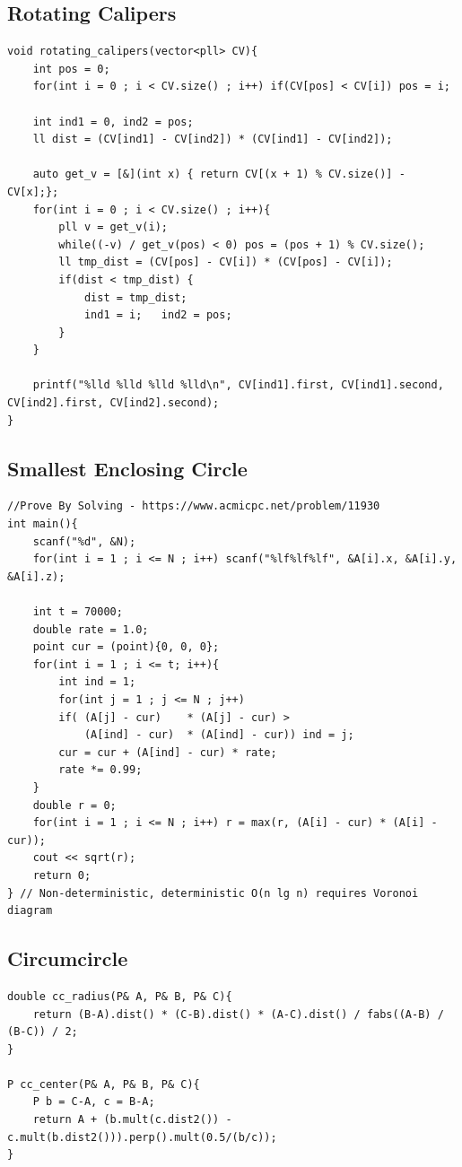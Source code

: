 \documentclass[landscape, 8pt, a4paper, oneside, twocolumn]{extarticle}
\begin{document}
\subsection{Rotating Calipers}
\begin{verbatim}
void rotating_calipers(vector<pll> CV){
    int pos = 0;
    for(int i = 0 ; i < CV.size() ; i++) if(CV[pos] < CV[i]) pos = i;

    int ind1 = 0, ind2 = pos;
    ll dist = (CV[ind1] - CV[ind2]) * (CV[ind1] - CV[ind2]);

    auto get_v = [&](int x) { return CV[(x + 1) % CV.size()] - CV[x];};
    for(int i = 0 ; i < CV.size() ; i++){
        pll v = get_v(i);
        while((-v) / get_v(pos) < 0) pos = (pos + 1) % CV.size();
        ll tmp_dist = (CV[pos] - CV[i]) * (CV[pos] - CV[i]);
        if(dist < tmp_dist) {
            dist = tmp_dist;
            ind1 = i;   ind2 = pos;
        }
    }

    printf("%lld %lld %lld %lld\n", CV[ind1].first, CV[ind1].second, CV[ind2].first, CV[ind2].second);
}
\end{verbatim}
\subsection{Smallest Enclosing Circle}
\begin{verbatim}
//Prove By Solving - https://www.acmicpc.net/problem/11930
int main(){
    scanf("%d", &N);
    for(int i = 1 ; i <= N ; i++) scanf("%lf%lf%lf", &A[i].x, &A[i].y, &A[i].z);
    
    int t = 70000;
    double rate = 1.0;
    point cur = (point){0, 0, 0};
    for(int i = 1 ; i <= t; i++){
        int ind = 1;
        for(int j = 1 ; j <= N ; j++)
        if( (A[j] - cur)    * (A[j] - cur) >
            (A[ind] - cur)  * (A[ind] - cur)) ind = j;
        cur = cur + (A[ind] - cur) * rate;
        rate *= 0.99;
    }
    double r = 0;
    for(int i = 1 ; i <= N ; i++) r = max(r, (A[i] - cur) * (A[i] - cur));
    cout << sqrt(r);
    return 0;
} // Non-deterministic, deterministic O(n lg n) requires Voronoi diagram
\end{verbatim}
\subsection{Circumcircle}
\begin{verbatim}
double cc_radius(P& A, P& B, P& C){
    return (B-A).dist() * (C-B).dist() * (A-C).dist() / fabs((A-B) / (B-C)) / 2;
}

P cc_center(P& A, P& B, P& C){
    P b = C-A, c = B-A;
    return A + (b.mult(c.dist2()) - c.mult(b.dist2())).perp().mult(0.5/(b/c));
}
\end{verbatim}
\end{document}
